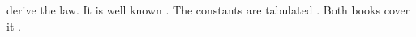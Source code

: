 \textcite{incropera2007} derive the law.
It is well known \parencite{incropera2007}.
The constants are tabulated \parencite[p.~12]{incropera2007}.
Both books cover it \parencite{halliday2018,incropera2007}.
